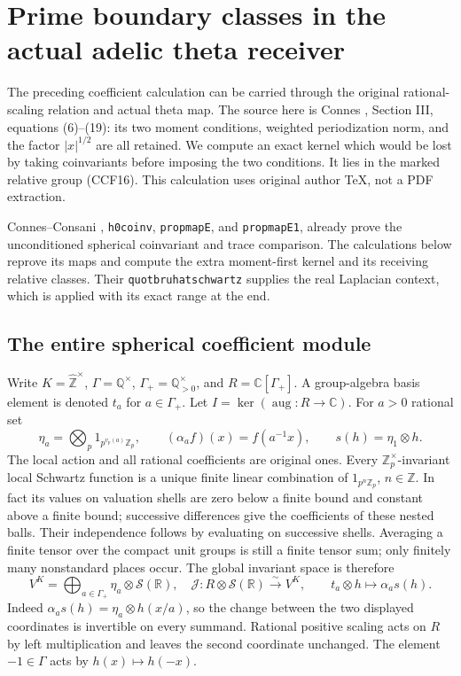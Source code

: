 \section{Prime boundary classes in the actual adelic theta receiver}
\label{sec:prime-memory-theta}

The preceding coefficient calculation can be carried through the
original rational-scaling relation and actual theta map. The
source here is Connes \cite{Connes1998}, Section III, equations
(6)--(19): its two moment conditions, weighted periodization norm,
and the factor $|x|^{1/2}$ are all retained. We compute an exact
kernel which would be lost by taking coinvariants before imposing
the two conditions. It lies in the marked relative group (CCF16).
This calculation uses original author TeX, not a PDF extraction.

Connes--Consani \cite{ConnesConsaniHochschild},
\texttt{h0coinv}, \texttt{propmapE}, and \texttt{propmapE1},
already prove the unconditioned spherical coinvariant and trace
comparison. The calculations below reprove its maps and compute
the extra moment-first kernel and its receiving relative classes.
Their \texttt{quotbruhatschwartz} supplies the real Laplacian
context, which is applied with its exact range at the end.

\subsection{The entire spherical coefficient module}

Write $K=\widehat{\mathbb Z}^{\times}$, $\Gamma=\mathbb Q^\times$,
$\Gamma_+=\mathbb Q_{>0}^{\times}$, and
$R=\mathbb C[\Gamma_+]$. A group-algebra basis element is denoted
$t_a$ for $a\in\Gamma_+$. Let $I=\ker(\operatorname{aug}:R\to\mathbb C)$.
For $a>0$ rational set
\[
 \eta_a=\bigotimes_p1_{p^{v_p(a)}\mathbb Z_p},\qquad
 (\alpha_a f)(x)=f(a^{-1}x),\qquad
 s(h)=\eta_1\otimes h.
 \tag{PM1}
\]
The local action and all rational coefficients are original ones.
Every $\mathbb Z_p^\times$-invariant local Schwartz function is
a unique finite linear combination of $1_{p^n\mathbb Z_p}$,
$n\in\mathbb Z$. In fact its values on valuation shells are
zero below a finite bound and constant above a finite bound;
successive differences give the coefficients of these nested
balls. Their independence follows by evaluating on successive
shells. Averaging a finite tensor over the compact unit groups
is still a finite tensor sum; only finitely many nonstandard
places occur. The global invariant space is therefore
\[
 V^K=\bigoplus_{a\in\Gamma_+}\eta_a\otimes\mathcal S(\mathbb R),
 \quad
 \mathcal J:R\otimes\mathcal S(\mathbb R)\xrightarrow{\sim}V^K,
 \qquad t_a\otimes h\longmapsto\alpha_a s(h).
 \tag{PM2}
\]
Indeed $\alpha_as(h)=\eta_a\otimes h(x/a)$, so the change
between the two displayed coordinates is invertible on every
summand. Rational positive scaling acts on $R$ by left
multiplication and leaves the second coordinate unchanged.
The element $-1\in\Gamma$ acts by $h(x)\mapsto h(-x)$.

